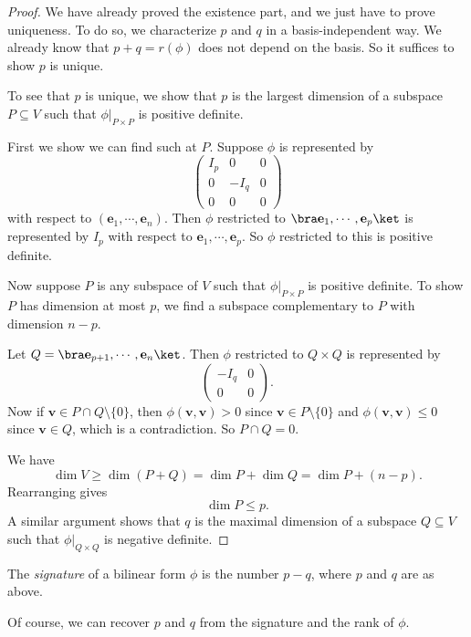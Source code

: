 \documentclass[a4paper]{article}
\begin{document}
\begin{proof}
  We have already proved the existence part, and we just have to prove uniqueness. To do so, we characterize $p$ and $q$ in a basis-independent way. We already know that $p + q = r(\phi)$ does not depend on the basis. So it suffices to show $p$ is unique.

  To see that $p$ is unique, we show that $p$ is the largest dimension of a subspace $P \subseteq V$ such that $\phi|_{P\times P}$ is positive definite.

  First we show we can find such at $P$. Suppose $\phi$ is represented by
  \[
    \begin{pmatrix}
      I_p & 0 & 0\\
      0 & -I_q & 0\\
      0 & 0 & 0
    \end{pmatrix}
  \]
  with respect to $(\mathbf{e}_1, \cdots, \mathbf{e}_n)$. Then $\phi$ restricted to $\bra \mathbf{e}_1, \cdots, \mathbf{e}_p\ket$ is represented by $I_p$ with respect to $\mathbf{e}_1, \cdots, \mathbf{e}_p$. So $\phi$ restricted to this is positive definite.

  Now suppose $P$ is any subspace of $V$ such that $\phi|_{P \times P}$ is positive definite. To show $P$ has dimension at most $p$, we find a subspace complementary to $P$ with dimension $n - p$.

  Let $Q = \bra \mathbf{e}_{p + 1}, \cdots, \mathbf{e}_n\ket$. Then $\phi$ restricted to $Q\times Q$ is represented by
  \[
    \begin{pmatrix}
      -I_q& 0\\
      0 & 0
    \end{pmatrix}.
  \]
  Now if $\mathbf{v} \in P\cap Q \setminus \{0\}$, then $\phi(\mathbf{v}, \mathbf{v}) > 0$ since $\mathbf{v}\in P\setminus \{0\}$ and $\phi(\mathbf{v}, \mathbf{v}) \leq 0$ since $\mathbf{v}\in Q$, which is a contradiction. So $P\cap Q = 0$.

  We have
  \[
    \dim V \geq \dim (P + Q) = \dim P + \dim Q = \dim P + (n - p).
  \]
  Rearranging gives
  \[
    \dim P \leq p.
\]
  A similar argument shows that $q$ is the maximal dimension of a subspace $Q\subseteq V$ such that $\phi|_{Q\times Q}$ is negative definite.
\end{proof}

\begin{defi}[Signature]
  The \emph{signature} of a bilinear form $\phi$ is the number $p - q$, where $p$ and $q$ are as above.
\end{defi}
Of course, we can recover $p$ and $q$ from the signature and the rank of $\phi$.
\end{document}
